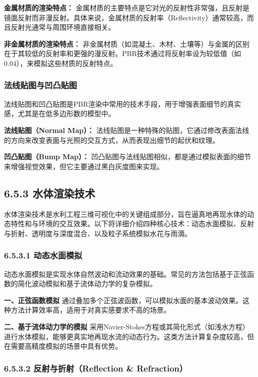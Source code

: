 \textbf{金属材质的渲染特点：}
金属材质的主要特点是它对光的反射性非常强，且反射是镜面反射而非漫反射。具体来说，金属材质的反射率（Reflectivity）通常较高，而且反射光通常与周围环境直接相关。

\textbf{非金属材质的渲染特点：}
非金属材质（如混凝土、木材、土壤等）与金属的区别在于其较低的反射率和更强的漫反射。PBR技术通过将反射率设为较低值（如0.04），来模拟这些材质的反射特点。

\subsubsection{法线贴图与凹凸贴图}\label{ux6cd5ux7ebfux8d34ux56feux4e0eux51f9ux51f8ux8d34ux56fe}

法线贴图和凹凸贴图是PBR渲染中常用的技术手段，用于增强表面细节的真实感，尤其是在低多边形数的模型中。

\textbf{法线贴图（Normal Map）：}
法线贴图是一种特殊的贴图，它通过修改表面法线的方向来改变表面与光照的交互方式，从而表现出细节的起伏和纹理。

\textbf{凹凸贴图（Bump Map）：}
凹凸贴图与法线贴图相似，都是通过模拟表面的细节来增强视觉效果，但它主要通过黑白灰度图来实现。

\subsection{6.5.3
水体渲染技术}\label{ux6c34ux4f53ux6e32ux67d3ux6280ux672f}

水体渲染技术是水利工程三维可视化中的关键组成部分，旨在逼真地再现水体的动态特性和与环境的交互效果。以下将详细介绍四种核心技术：动态水面模拟、反射与折射、透明度与深度混合、以及粒子系统模拟水花与雨滴。

\subsubsection{6.5.3.1
动态水面模拟}\label{ux52a8ux6001ux6c34ux9762ux6a21ux62df}

动态水面模拟是实现水体自然波动和流动效果的基础。常见的方法包括基于正弦函数的简化波动模拟和基于流体动力学的复杂模拟。

\textbf{一、正弦函数模拟}
通过叠加多个正弦波函数，可以模拟水面的基本波动效果。这种方法计算效率高，适用于对真实感要求不高的场景。

\textbf{二、基于流体动力学的模拟}
采用Navier-Stokes方程或其简化形式（如浅水方程）进行水体模拟，能够更真实地再现水流的动态行为。这类方法计算复杂度较高，但在需要高精度模拟的场景中具有优势。

\subsubsection{6.5.3.2 反射与折射（Reflection \&
Refraction）}\label{ux53cdux5c04ux4e0eux6298ux5c04reflection-refraction}

